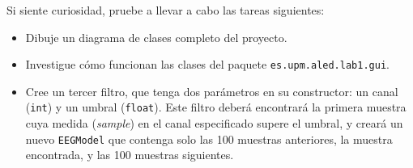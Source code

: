 \documentclass[10pt,a4paper,spanish]{article}
\newcommand{\code}[1]{\texttt{#1}}
\begin{document}
Si siente curiosidad, pruebe a llevar a cabo las tareas siguientes:

\begin{itemize}
\item Dibuje un diagrama de clases completo del proyecto.
\item Investigue cómo funcionan las clases del paquete \code{es.upm.aled.lab1.gui}.
\item Cree un tercer filtro, que tenga dos parámetros en su constructor: un canal (\code{int}) y un umbral (\code{float}). Este filtro deberá encontrará la primera muestra cuya medida (\textit{sample}) en el canal especificado supere el umbral, y creará un nuevo \code{EEGModel} que contenga solo las 100 muestras anteriores, la muestra encontrada, y las 100 muestras siguientes.
\end{itemize}
\end{document}
